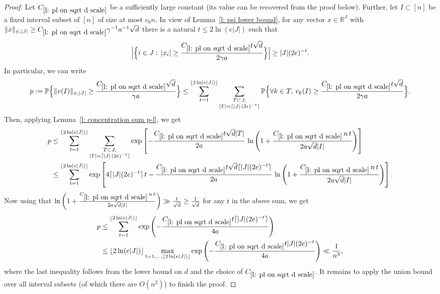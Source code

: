 \documentclass[12pt]{article}
\theoremstyle{definition}
\theoremstyle{plain}
\newcommand{\R}{\mathbb{R}}
\def\Prob{{\mathbb P}}
\begin{document}
\begin{proof}
Let $C_{\ref{l: pl on sqrt d scale}}$ be a sufficiently large constant (its value can be recovered from the proof below).
Further, let $I\subset [n]$ be a fixed interval subset of $[n]$ of size at most $c_0n$.
In view of Lemma~\ref{l: psi lower bound}, for any vector $x\in\R^J$ with
$\|x\|_{\psi,|J|}\geq C_{\ref{l: pl on sqrt d scale}}\gamma^{-1}a^{-1}\sqrt{d}$
there is a natural $t\leq 2\ln(e|J|)$ such that
$$\Big|\Big\{i\in J:\,|x_i|\geq \frac{C_{\ref{l: pl on sqrt d scale}}t\sqrt{d}}{2\gamma a}\Big\}\Big|\geq |J|(2e)^{-t}.$$
In particular, we can write
\begin{align*}
p:=\Prob \Big\{\Vert v(I)\Vert_{\psi, \vert J\vert}\geq \frac{C_{\ref{l: pl on sqrt d scale}}\sqrt{d}}{\gamma a}\Big\}
\leq \sum_{t=1}^{\lfloor 2\ln(e|J|)\rfloor}
\sum_{\substack{T\subset J,\\ \vert T\vert = \lceil \vert J\vert\, (2e)^{-t}\rceil}}  
\Prob\Big\{\forall k\in T,\, v_k(I) \geq \frac{C_{\ref{l: pl on sqrt d scale}}t\sqrt{d}}{2\gamma a}\Big\}.
\end{align*}
Then, applying Lemma~\ref{l: concentration sum p-l}, we get 
\begin{align*}
p&\leq \sum_{t=1}^{\lfloor 2\ln(e|J|)\rfloor} \sum_{\substack{T\subset J,\\ \vert T\vert = \lceil \vert J\vert\, (2e)^{-t}\rceil}} 
\exp\left[-\frac{C_{\ref{l: pl on sqrt d scale}}t\sqrt{d}\vert T\vert}{2a} \, 
\ln \left(1+\frac{C_{\ref{l: pl on sqrt d scale}} \, n\, t}{2a\sqrt{d}\vert I\vert}\right)\right]\\
&\leq  \sum_{t=1}^{\lfloor 2\ln(e|J|)\rfloor}
\exp\left[4\lceil |J|(2e)^{-t}\rceil \,t -\frac{C_{\ref{l: pl on sqrt d scale}}t\sqrt{d}\lceil |J|(2e)^{-t}\rceil}{2a} \, 
\ln \left(1+\frac{C_{\ref{l: pl on sqrt d scale}} \, n\, t}{2a\sqrt{d}\vert I\vert}\right)\right].
\end{align*}
Now using that $\ln\left(1+\frac{C_{\ref{l: pl on sqrt d scale}} \, n\, t}{2a\sqrt{d}\vert I\vert}\right)
\gg \frac{t}{\sqrt{d}}\geq \frac{1}{\sqrt{d}}$ for any $t$ in the above sum, we get 
\begin{align*}
p&\leq  \sum_{t=1}^{\lfloor 2\ln(e|J|)\rfloor} \exp\left(-\frac{C_{\ref{l: pl on sqrt d scale}}t\lceil |J|(2e)^{-t}\rceil}{4a}\right)\\
&\leq \lfloor 2\ln(e|J|)\rfloor
\max_{t=1,\ldots, \lfloor 2\ln(e|J|)\rfloor} \exp\left(-\frac{C_{\ref{l: pl on sqrt d scale}}t |J|(2e)^{-t}}{4a}\right)
\ll \frac{1}{n^3},
\end{align*}
where the last inequality follows from the lower bound on $d$
and the choice of $C_{\ref{l: pl on sqrt d scale}}$. 
It remains to apply the union bound over all interval subsets (of which there are $O(n^2)$) to finish the proof.
\end{proof}
\end{document}
